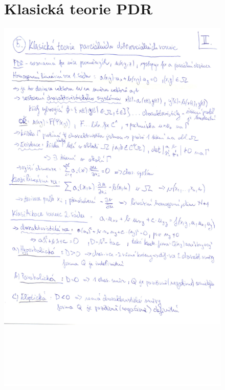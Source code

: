 \documentclass[a4]{report}
\theoremstyle{definition}
\begin{document}
\begin{figure}[H]
\section{Klasická teorie PDR}
\includegraphics[width=\textwidth]{2-5a.jpg}
\end{figure}
\end{document}
